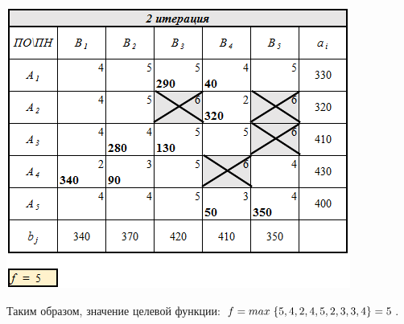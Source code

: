 \documentclass[14pt,a4paper,fleqn]{extarticle}
\begin{document}
\begin{center}
	\includegraphics[scale=0.64]{3}
\end{center}
Таким образом, значение целевой функции: $f = max \hspace*{0.1cm} \{5,4,2,4,5,2,3,3,4\} = 5$.
\newpage
\end{document}
